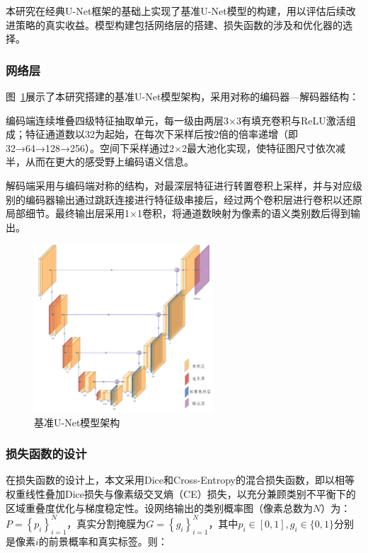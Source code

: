 本研究在经典U-Net框架的基础上实现了基准U-Net模型的构建，用以评估后续改进策略的真实收益。模型构建包括网络层的搭建、损失函数的涉及和优化器的选择。

\subsubsection{网络层}

图~\ref{fig:unet_ushape}展示了本研究搭建的基准U-Net模型架构，采用对称的编码器—解码器结构：

编码端连续堆叠四级特征抽取单元，每一级由两层3×3有填充卷积与ReLU激活组成；特征通道数以32为起始，在每次下采样后按2倍的倍率递增（即32→64→128→256）。空间下采样通过2×2最大池化实现，使特征图尺寸依次减半，从而在更大的感受野上编码语义信息。

解码端采用与编码端对称的结构，对最深层特征进行转置卷积上采样，并与对应级别的编码器输出通过跳跃连接进行特征级串接后，经过两个卷积层进行卷积以还原局部细节。最终输出层采用1×1卷积，将通道数映射为像素的语义类别数后得到输出。

\begin{figure}[h]
    \centering
    \includegraphics[width=0.6\textwidth]{fig/Unet_ushape.png}
    \caption{基准U-Net模型架构}
    \label{fig:unet_ushape}
\end{figure}

\subsubsection{损失函数的设计}

在损失函数的设计上，本文采用Dice和Cross-Entropy的混合损失函数，即以相等权重线性叠加Dice损失与像素级交叉熵（CE）损失，以充分兼顾类别不平衡下的区域重叠度优化与梯度稳定性。设网络输出的类别概率图（像素总数为$N$）为：$ P=\left\{p_{i}\right\}_{i=1}^{N} $，真实分割掩膜为$ G=\left\{g_{i}\right\}_{i=1}^{N} $，其中$ p_{i} \in[0,1], g_{i} \in\{0,1\}$分别是像素$i$的前景概率和真实标签。则：

